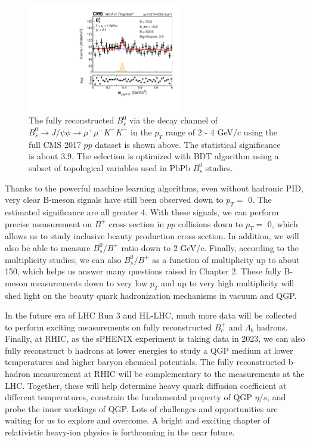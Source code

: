  \begin{figure}[hbtp]
\begin{center}
\includegraphics[width=0.60\textwidth]{Figures/Chapter6/BsLow.pdf}
\caption{The fully reconstructed $B^0_s$ via the decay channel of $B^0_s\rightarrow J/\psi \phi  \rightarrow \mu^+\mu^- K^+ K^-$ in the $p_T$ range of 2 - 4 GeV/c using the full CMS 2017 $pp$ dataset is shown above. The statistical significance is about 3.9. The selection is optimized with BDT algorithm using a subset of topological variables used in PbPb $B^0_s$ studies.}
\label{BsLow}
\end{center}
\end{figure}   

Thanks to the powerful machine learning algorithms, even without hadronic PID, very clear B-meson signals have still been observed down to $p_T =$ 0. The estimated significance are all greater 4. With these signals, we can perform precise measurement on $B^+$ cross section in $pp$ collisions down to $p_T =$ 0, which allows us to study inclusive beauty production cross section. In addition, we will also be able to measure $B^0_s/B^+$ ratio down to 2 GeV/c. Finally, according to the multiplicity studies, we can also $B^0_s/B^+$ as a function of multiplicity up to about 150, which helps us answer many questions raised in Chapter 2.  These fully B-meson measurements down to very low $p_T$ and up to very high multiplicity will shed light on the beauty quark hadronization mechanisms in vacuum and QGP.

In the future era of LHC Run 3 and HL-LHC, much more data will be collected to perform exciting measurements on fully reconstructed $B^+_c$ and $\Lambda_b$ hadrons. Finally, at RHIC, as the sPHENIX experiment is taking data in 2023, we can also fully reconstruct b hadrons at lower energies to study a QGP medium at lower temperatures and higher baryon chemical potentials. The fully reconstructed b-hadron measurement at RHIC will be complementary to the measurements at the LHC. Together, these will help determine heavy quark diffusion coefficient at different temperatures, constrain the fundamental property of QGP $\eta/s$, and probe the inner workings of QGP. Lots of challenges and opportunities are waiting for us to explore and overcome. A bright and exciting chapter of relativistic heavy-ion physics is forthcoming in the near future.



